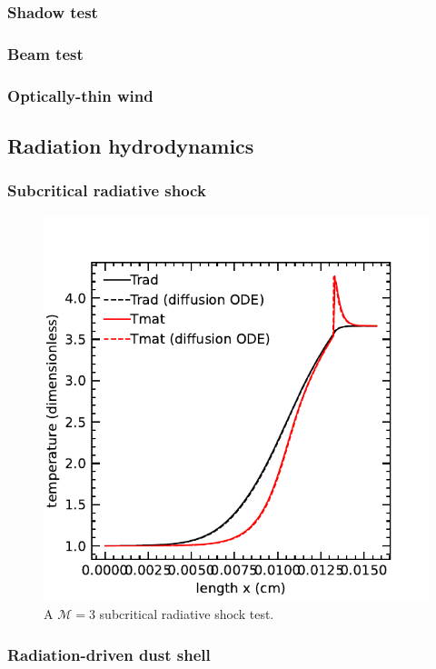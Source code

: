 \documentclass[fleqn,usenatbib]{mnras}
\begin{document}
\subsubsection{Shadow test}
\subsubsection{Beam test}
\subsubsection{Optically-thin wind}

\subsection{Radiation hydrodynamics}
\subsubsection{Subcritical radiative shock}
\begin{figure}
    \includegraphics[width=\columnwidth]{radshock_cgs_temperature.pdf}
    \caption{A $\mathcal{M} = 3$ subcritical radiative shock test.}
    \label{fig:radshock}
\end{figure}
\subsubsection{Radiation-driven dust shell}
\end{document}
